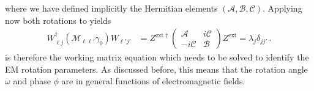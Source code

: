 where we have defined implicitly the Hermitian elements $(\mathcal{A},\mathcal{B},\mathcal{C})$.  Applying now both rotations 
to  yields
\begin{align}
    \label{herm:4}
    W_{\ell j}^{\dag}(\mathcal{M}_{\ell\ell'}\gamma_{0})W_{\ell' j'} &= 
    Z^{\mathrm{ext}\dag}
    \begin{pmatrix}
        \mathcal{A} & i\mathcal{C}\\
        -i\mathcal{C} & \mathcal{B}
    \end{pmatrix}Z^\mathrm{ext}=\lambda_{j}\delta_{jj'}\,.
\end{align}
 is therefore the working matrix equation which needs to be solved to identify the EM rotation parameters. As discussed before, this means that the rotation angle $\omega$ and phase $\phi$ are in general functions of electromagnetic fields.

